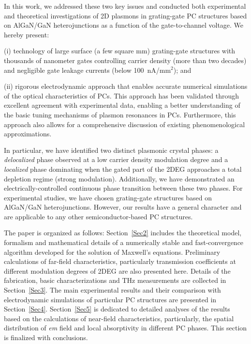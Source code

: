 \documentclass[%
 reprint,
 amsmath,amssymb,
 aps,
]{revtex4-2}
\begin{document}
In this work, we addressed these two key issues and conducted both experimental and theoretical investigations of 2D plasmons in grating-gate PC structures based on AlGaN/GaN heterojunctions as a function of the gate-to-channel voltage. We hereby present: 

(i) technology of large surface (a few square mm) grating-gate structures with thousands of nanometer gates controlling carrier density (more than two decades) and negligible gate leakage currents (below 100~nA/mm$^{2}$); and  

(ii) rigorous electrodynamic approach that enables accurate numerical simulations of the optical characteristics of PCs. This approach has been validated through excellent agreement with experimental data, enabling a better understanding of the basic tuning mechanisms of plasmon resonances in PCs. Furthermore, this approach also allows for a comprehensive discussion of existing phenomenological approximations.

In particular, we have identified two distinct plasmonic crystal phases: a \textit{delocalized} phase observed at a low carrier density modulation degree and a \textit{ localized} phase dominating when the gated part of the 2DEG approaches a total depletion regime (strong modulation). Additionally, we have demonstrated an electrically-controlled continuous phase transition between these two phases. For experimental studies, we have chosen grating-gate structures based on AlGaN/GaN heterojunctions. However, our results have a general character and are applicable to any other semiconductor-based PC structures.

The paper is organized as follows: Section~\ref{Sec2} includes the theoretical model, formalism and mathematical details of a numerically stable and fast-convergence algorithm developed for the solution of Maxwell's equations.  
Preliminary calculations of far-field characteristics, particularly transmission coefficients at different modulation degrees of 2DEG are also presented here. Details of the fabrication, basic characterizations and THz measurements are collected in Section~\ref{Sec3}. 
The main experimental results and their comparison with electrodynamic simulations of particular PC structures are presented in Section~\ref{Sec4}.
Section~\ref{Sec5} is dedicated to detailed analyses of the results based on the calculations of near-field characteristics, particularly, the spatial distribution of \textit{em} field and local absorptivity in different PC phases.
This section is finalized with conclusions.
\end{document}
